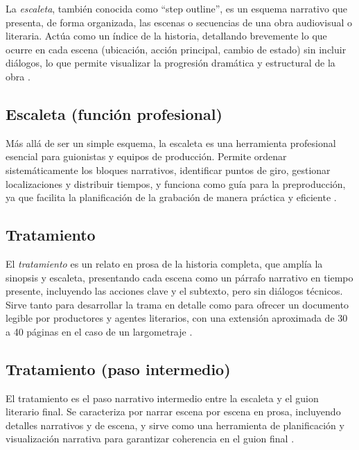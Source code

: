 \documentclass[12pt]{article}
\begin{document}
	\hspace{1.27cm}La \textit{escaleta}, también conocida como “step outline”, es un esquema narrativo que presenta, de forma organizada, las escenas o secuencias de una obra audiovisual o literaria. Actúa como un índice de la historia, detallando brevemente lo que ocurre en cada escena (ubicación, acción principal, cambio de estado) sin incluir diálogos, lo que permite visualizar la progresión dramática y estructural de la obra \parencite{escaleta_wikipedia,aprendercine_escaleta}.

	\subsection{Escaleta (función profesional)}

	\hspace{1.27cm}Más allá de ser un simple esquema, la escaleta es una herramienta profesional esencial para guionistas y equipos de producción. Permite ordenar sistemáticamente los bloques narrativos, identificar puntos de giro, gestionar localizaciones y distribuir tiempos, y funciona como guía para la preproducción, ya que facilita la planificación de la grabación de manera práctica y eficiente \parencite{treintaycinco_escaleta,escueladesarts_escaleta}.

	\subsection{Tratamiento}

	\hspace{1.27cm}El \textit{tratamiento} es un relato en prosa de la historia completa, que amplía la sinopsis y escaleta, presentando cada escena como un párrafo narrativo en tiempo presente, incluyendo las acciones clave y el subtexto, pero sin diálogos técnicos. Sirve tanto para desarrollar la trama en detalle como para ofrecer un documento legible por productores y agentes literarios, con una extensión aproximada de 30 a 40 páginas en el caso de un largometraje \parencite{revista24cuadros_tratamiento,tratamiento_wikipedia}.

	\subsection{Tratamiento (paso intermedio)}

	\hspace{1.27cm}El tratamiento es el paso narrativo intermedio entre la escaleta y el guion literario final. Se caracteriza por narrar escena por escena en prosa, incluyendo detalles narrativos y de escena, y sirve como una herramienta de planificación y visualización narrativa para garantizar coherencia en el guion final \parencite{unir_escaleta_tratamiento,tratamiento_wikipedia}.
\end{document}
